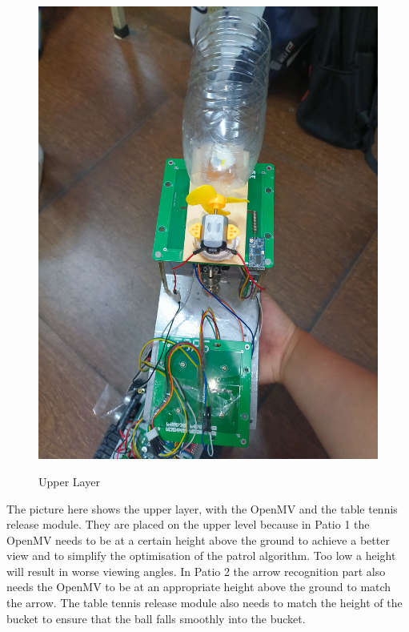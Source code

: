 \documentclass[12pt, a4paper, oneside]{report}
\begin{document}
\begin{figure}[H]
\begin{minipage}[t]{0.48\textwidth}
    \label{fig:Upper Layer Front View}
  \end{minipage}\hfill
  \begin{minipage}[t]{0.48\textwidth}
    \centering
    \includegraphics[width=\textwidth,height=0.38\textheight]{pic/Hardware Design/Upper Layer Back View.jpg}
    \label{fig:Upper Layer Back View}
  \end{minipage}
  \caption{Upper Layer}
  \label{fig:both_images}
\end{figure}








The picture here shows the upper layer, with the OpenMV and the table tennis release module. They are placed on the upper level because in Patio 1 the OpenMV needs to be at a certain height above the ground to achieve a better view and to simplify the optimisation of the patrol algorithm. Too low a height will result in worse viewing angles. In Patio 2 the arrow recognition part also needs the OpenMV to be at an appropriate height above the ground to match the arrow. The table tennis release module also needs to match the height of the bucket to ensure that the ball falls smoothly into the bucket. 
\end{document}

